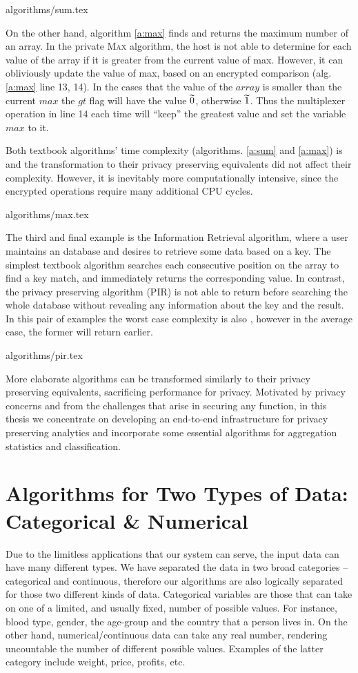 {algorithms/sum.tex}


On the other hand, algorithm \ref{a:max} finds and returns the maximum number of an array.
In the private {\textsc{Max}} algorithm, the host is not able to determine for each value of the array if it is greater from the current value of max.
However, it can obliviously update the value of max, based on an encrypted comparison (alg. \ref{a:max} line 13, 14).
In the cases that the value of the $array$ is smaller than the current $max$ the $gt$ flag will have the value $\widetilde{0}$, otherwise $\widetilde{1}$.
Thus the multiplexer operation in line 14 each time will ``keep'' the greatest value and set the variable $max$ to it.

Both textbook algorithms' time complexity (algorithms. \ref{a:sum} and \ref{a:max}) is  and the transformation to their privacy preserving equivalents did not affect their complexity.
However, it is inevitably more computationally intensive, since the encrypted operations require many additional CPU cycles.

{algorithms/max.tex}


The third and final example is the Information Retrieval algorithm, where a user maintains an database and desires to retrieve some data based on a key.
The simplest textbook algorithm searches each consecutive position on the array to find a key match, and immediately returns the corresponding value.
In contrast, the privacy preserving algorithm (PIR) is not able to return before searching the whole database without revealing any information about the key and the result.
In this pair of examples the worst case complexity is also , however in the average case, the former will return earlier.


{algorithms/pir.tex}


More elaborate algorithms can be transformed similarly to their privacy preserving equivalents, sacrificing performance for privacy.
Motivated by privacy concerns and from the challenges that arise in securing any function, in this thesis we concentrate on developing an end-to-end infrastructure for privacy preserving analytics and incorporate some essential algorithms for aggregation statistics and classification.




\section{Algorithms for Two Types of Data: Categorical \& Numerical}\label{s:two-types-of-data}
Due to the limitless applications that our system can serve, the input data can have many different types.
We have separated the data in two broad categories -- categorical and continuous, therefore our algorithms are also logically separated for those two different kinds of data.
Categorical variables are those that can take on one of a limited, and usually fixed, number of possible values.
For instance, blood type, gender, the age-group and the country that a person lives in.
On the other hand, numerical/continuous data can take any real number, rendering uncountable the number of different possible values.
Examples of the latter category include weight, price, profits, etc.

